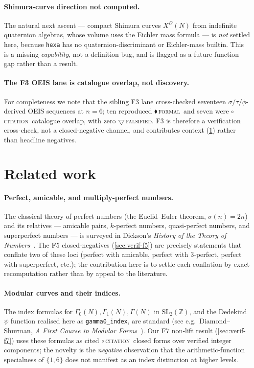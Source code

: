 \documentclass[11pt,a4paper]{article}
\newcommand{\sig}{\sigma}
\newcommand{\tierF}{\textcolor{blue!60!black}{$\blacklozenge$}\,\textsc{formal}}
\newcommand{\tierR}{\textcolor{red!70!black}{$\bigtriangledown$}\,\textsc{falsified}}
\newcommand{\tierC}{\textcolor{orange!85!black}{$\circ$}\,\textsc{citation}}
\theoremstyle{definition}
\begin{document}
\paragraph{Shimura-curve direction not computed.} The natural next ascent ---
compact Shimura curves $X^D(N)$ from indefinite quaternion algebras, whose
volume uses the Eichler mass formula --- is \emph{not} settled here, because
\texttt{hexa} has no quaternion-discriminant or Eichler-mass builtin. This is a
missing \emph{capability}, not a definition bug, and is flagged as a future
function gap rather than a result.

\paragraph{The F3 OEIS lane is catalogue overlap, not discovery.} For
completeness we note that the sibling F3 lane cross-checked seventeen
$\sig/\tau/\phi$-derived OEIS sequences at $n=6$; ten reproduced \tierF\ and
seven were \tierC\ catalogue overlap, with zero \tierR. F3 is therefore a
verification cross-check, not a closed-negative channel, and contributes context
(\textsection\ref{sec:related}) rather than headline negatives.

\section{Related work}
\label{sec:related}

\paragraph{Perfect, amicable, and multiply-perfect numbers.} The classical
theory of perfect numbers (the Euclid--Euler theorem, $\sig(n)=2n$) and its
relatives --- amicable pairs, $k$-perfect numbers, quasi-perfect numbers, and
superperfect numbers --- is surveyed in Dickson's \emph{History of the Theory of
Numbers}~\cite{euclid}. The F5 closed-negatives (\textsection\ref{sec:verif-f5})
are precisely statements that conflate two of these loci (perfect with amicable,
perfect with $3$-perfect, perfect with superperfect, etc.); the contribution
here is to settle each conflation by exact recomputation rather than by appeal
to the literature.

\paragraph{Modular curves and their indices.} The index formulas for
$\Gamma_0(N),\Gamma_1(N),\Gamma(N)$ in $\mathrm{SL}_2(\mathbb{Z})$, and the
Dedekind $\psi$ function realised here as \texttt{gamma0\_index}, are standard
(see e.g.\ Diamond--Shurman, \emph{A First Course in Modular
Forms}~\cite{diamondshurman}). Our F7 non-lift result
(\textsection\ref{sec:verif-f7}) uses these formulas as cited \tierC\ closed
forms over verified integer components; the novelty is the \emph{negative}
observation that the arithmetic-function specialness of $\{1,6\}$ does not
manifest as an index distinction at higher levels.
\end{document}
